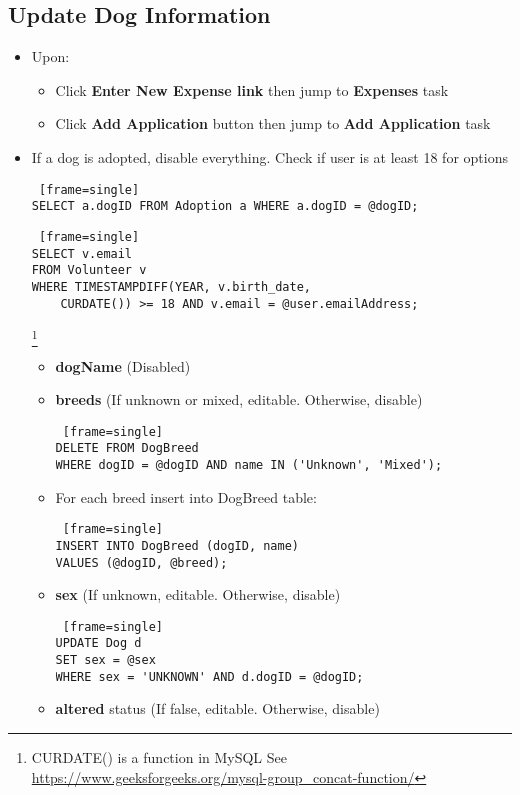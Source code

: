 \documentclass{article}
\begin{document}
\subsection{Update Dog Information}
\begin{itemize}
    \item Upon:
    \begin{itemize}
        \item Click \textbf{Enter New Expense link} then jump to \textbf{Expenses} task
        \item Click \textbf{Add Application} button then jump to \textbf{Add Application} task
    \end{itemize}
    \item If a dog is adopted, disable everything. Check if user is at least 18 for options
    \begin{Verbatim} [frame=single]
SELECT a.dogID FROM Adoption a WHERE a.dogID = @dogID;
    \end{Verbatim}
    \begin{Verbatim} [frame=single]
SELECT v.email 
FROM Volunteer v 
WHERE TIMESTAMPDIFF(YEAR, v.birth_date, 
    CURDATE()) >= 18 AND v.email = @user.emailAddress;
    \end{Verbatim}
    \footnote{CURDATE() is a function in MySQL See \url{https://www.geeksforgeeks.org/mysql-group_concat-function/}}
    \begin{itemize}
        \item \textbf{dogName} (Disabled)
        \item \textbf{breeds} (If unknown or mixed, editable. Otherwise, disable)
        \begin{Verbatim} [frame=single]
DELETE FROM DogBreed
WHERE dogID = @dogID AND name IN ('Unknown', 'Mixed');
        \end{Verbatim}
        \item For each breed insert into DogBreed table:
        \begin{Verbatim} [frame=single]
INSERT INTO DogBreed (dogID, name)
VALUES (@dogID, @breed);
        \end{Verbatim}
        \item \textbf{sex} (If unknown, editable. Otherwise, disable)
        \begin{Verbatim} [frame=single]
UPDATE Dog d
SET sex = @sex
WHERE sex = 'UNKNOWN' AND d.dogID = @dogID;
        \end{Verbatim}
        \item \textbf{altered} status (If false, editable. Otherwise, disable)

\end{itemize}
\end{itemize}
\end{document}
